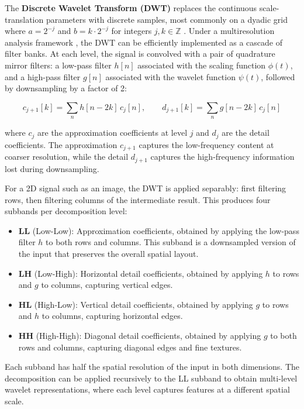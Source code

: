 The \textbf{Discrete Wavelet Transform (DWT)} replaces the continuous scale-translation parameters with discrete samples, most commonly on a dyadic grid where $a = 2^{-j}$ and $b = k \cdot 2^{-j}$ for integers $j, k \in \mathbb{Z}$ \cite{mallat1989theory}. Under a multiresolution analysis framework \cite{mallat1989theory}, the DWT can be efficiently implemented as a cascade of filter banks. At each level, the signal is convolved with a pair of quadrature mirror filters: a low-pass filter $h[n]$ associated with the scaling function $\phi(t)$, and a high-pass filter $g[n]$ associated with the wavelet function $\psi(t)$, followed by downsampling by a factor of 2:

\begin{equation}
    c_{j+1}[k] = \sum_{n} h[n - 2k] \, c_j[n], \qquad
    d_{j+1}[k] = \sum_{n} g[n - 2k] \, c_j[n]
\end{equation}

where $c_j$ are the approximation coefficients at level $j$ and $d_j$ are the detail coefficients. The approximation $c_{j+1}$ captures the low-frequency content at coarser resolution, while the detail $d_{j+1}$ captures the high-frequency information lost during downsampling.

For a 2D signal such as an image, the DWT is applied separably: first filtering rows, then filtering columns of the intermediate result. This produces four subbands per decomposition level:

\begin{itemize}
    \item \textbf{LL} (Low-Low): Approximation coefficients, obtained by applying the low-pass filter $h$ to both rows and columns. This subband is a downsampled version of the input that preserves the overall spatial layout.
    \item \textbf{LH} (Low-High): Horizontal detail coefficients, obtained by applying $h$ to rows and $g$ to columns, capturing vertical edges.
    \item \textbf{HL} (High-Low): Vertical detail coefficients, obtained by applying $g$ to rows and $h$ to columns, capturing horizontal edges.
    \item \textbf{HH} (High-High): Diagonal detail coefficients, obtained by applying $g$ to both rows and columns, capturing diagonal edges and fine textures.
\end{itemize}

Each subband has half the spatial resolution of the input in both dimensions. The decomposition can be applied recursively to the LL subband to obtain multi-level wavelet representations, where each level captures features at a different spatial scale.

